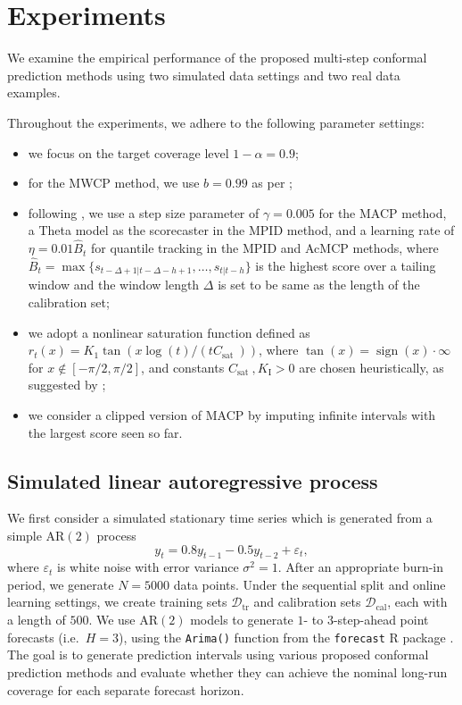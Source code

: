 \documentclass[
  11pt,
  a4paper,
]{article}
\providecommand{\tightlist}{%
  \setlength{\itemsep}{0pt}\setlength{\parskip}{0pt}}\usepackage{longtable,booktabs,array}
\theoremstyle{plain}
\theoremstyle{remark}
\begin{document}
\section{Experiments}\label{experiments}

We examine the empirical performance of the proposed multi-step
conformal prediction methods using two simulated data settings and two
real data examples.

Throughout the experiments, we adhere to the following parameter
settings:

\begin{itemize}
\tightlist
\item
  we focus on the target coverage level \(1-\alpha=0.9\);
\item
  for the MWCP method, we use \(b=0.99\) as per \textcite{barber2023};
\item
  following \textcite{angelopoulos2024}, we use a step size parameter of
  \(\gamma=0.005\) for the MACP method, a Theta model as the scorecaster
  in the MPID method, and a learning rate of \(\eta=0.01\hat{B}_t\) for
  quantile tracking in the MPID and AcMCP methods, where
  \(\hat{B}_t=\max\{s_{t-\Delta+1|t-\Delta-h+1},\dots,s_{t|t-h}\}\) is
  the highest score over a tailing window and the window length
  \(\Delta\) is set to be same as the length of the calibration set;
\item
  we adopt a nonlinear saturation function defined as
  \(r_t(x)=K_1 \tan \left(x \log (t) / (t C_{\text {sat }})\right)\),
  where \(\tan (x)=\operatorname{sign}(x) \cdot \infty\) for
  \(x \notin[-\pi / 2, \pi / 2]\), and constants
  \(C_{\text {sat }}, K_{\mathrm{I}}>0\) are chosen heuristically, as
  suggested by \textcite{angelopoulos2024};
\item
  we consider a clipped version of MACP by imputing infinite intervals
  with the largest score seen so far.
\end{itemize}

\subsection{Simulated linear autoregressive
process}\label{simulated-linear-autoregressive-process}

We first consider a simulated stationary time series which is generated
from a simple AR\((2)\) process \[
y_t = 0.8y_{t-1} - 0.5y_{t-2} + \varepsilon_t,
\] where \(\varepsilon_t\) is white noise with error variance
\(\sigma^2 = 1\). After an appropriate burn-in period, we generate
\(N=5000\) data points. Under the sequential split and online learning
settings, we create training sets \(\mathcal{D}_{\text{tr}}\) and
calibration sets \(\mathcal{D}_{\text{cal}}\), each with a length of
\(500\). We use AR\((2)\) models to generate \(1\)- to \(3\)-step-ahead
point forecasts (i.e.~\(H=3\)), using the \texttt{Arima()} function from
the \texttt{forecast} R package \autocite{hyndman2024}. The goal is to
generate prediction intervals using various proposed conformal
prediction methods and evaluate whether they can achieve the nominal
long-run coverage for each separate forecast horizon.
\end{document}
